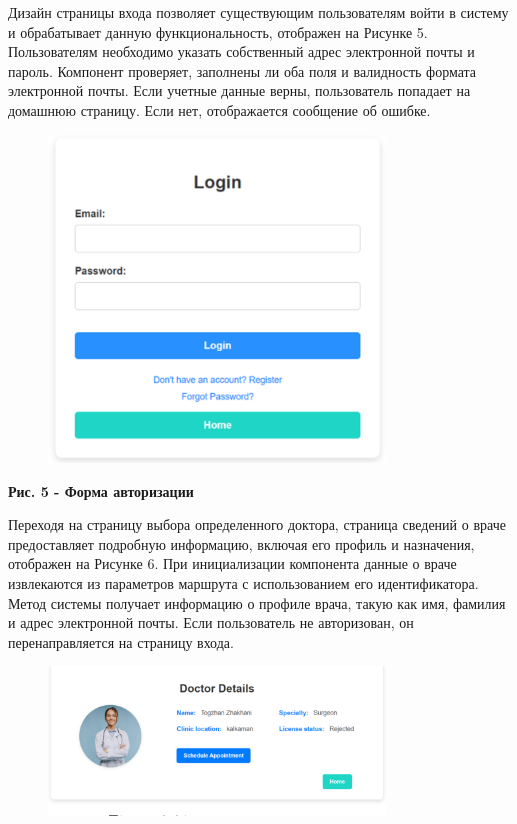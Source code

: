 Дизайн страницы входа позволяет существующим пользователям войти в
систему и обрабатывает данную функциональность, отображен на Рисунке 5.
Пользователям необходимо указать собственный адрес электронной почты и
пароль. Компонент проверяет, заполнены ли оба поля и валидность формата
электронной почты. Если учетные данные верны, пользователь попадает на
домашнюю страницу. Если нет, отображается сообщение об ошибке.

\begin{figure}[H]
	\centering
	\includegraphics[width=0.8\textwidth]{assets/155}
	\caption*{}
\end{figure}

{\bfseries Рис. 5 - Форма авторизации}

Переходя на страницу выбора определенного доктора, страница сведений о
враче предоставляет подробную информацию, включая его профиль и
назначения, отображен на Рисунке 6. При инициализации компонента данные
о враче извлекаются из параметров маршрута с использованием его
идентификатора. Метод системы получает информацию о профиле врача, такую
как имя, фамилия и адрес электронной почты. Если пользователь не
авторизован, он перенаправляется на страницу входа.

\begin{figure}[H]
	\centering
	\includegraphics[width=0.8\textwidth]{assets/156}
	\caption*{}
\end{figure}

